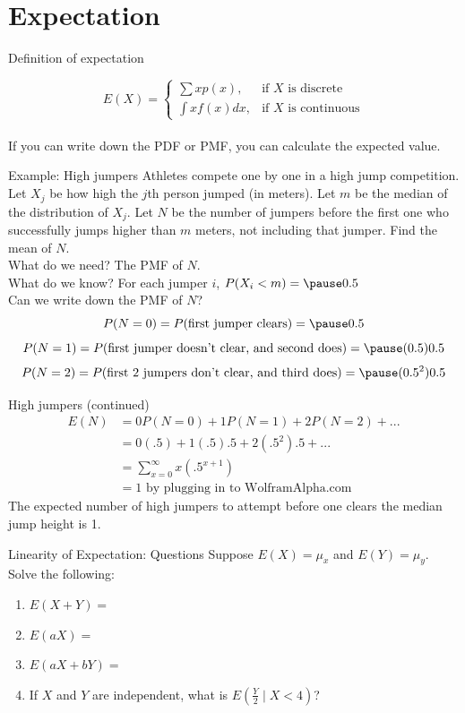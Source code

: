 \documentclass{beamer}
\begin{document}
\section{Expectation}
\begin{frame}{Definition of expectation}

$$E(X)=\begin{cases} \sum xp(x),& \text{if }X\text{ is discrete} \\
\int xf(x)dx,&\text{if }X\text{ is continuous}\end{cases}$$
\\
\alert{If you can write down the PDF or PMF, you can calculate the expected value.}
\end{frame}

\begin{frame}{Example: High jumpers}
Athletes compete one by one in a high jump competition. Let $X_j$ be how high the $j$th person jumped (in meters). Let $m$ be the median of the distribution of $X_j$. Let $N$ be the number of jumpers before the first one who successfully jumps higher than $m$ meters, not including that jumper. Find the mean of $N$.\\
\alert{What do we need?} \pause The PMF of $N$. \pause \\
\alert{What do we know?} \pause For each jumper $i$, $P(X_i<m)=\pause 0.5$ \\ \pause
\alert{Can we write down the PMF of $N$?} \\
\pause
$$P(N=0) = P(\text{first jumper clears}) = \pause 0.5$$
$$P(N=1) = P(\text{first jumper doesn't clear, and second does}) = \pause (0.5)0.5$$
$$P(N=2) = P(\text{first 2 jumpers don't clear, and third does}) = \pause (0.5^2)0.5$$
\end{frame}

\begin{frame}{High jumpers (continued)}
\begin{align*}
E(N) &= 0P(N=0) + 1P(N=1) + 2P(N=2) +... \\
&= 0(.5) + 1(.5).5 + 2(.5^2).5 +... \\
&= \sum_{x=0}^\infty x\left (.5^{x+1}\right ) \\
&= 1 \text{ by plugging in to WolframAlpha.com}
\end{align*}
The expected number of high jumpers to attempt before one clears the median jump height is 1.
\end{frame}

\begin{frame}{Linearity of Expectation: Questions}
Suppose $E(X)=\mu_x$ and $E(Y)=\mu_y$. Solve the following:
\begin{enumerate}
\item $E(X+Y) = $
\item $E(aX) = $
\item $E(aX+bY) = $
\item If $X$ and $Y$ are independent, what is $E\left(\frac{Y}{2}\mid X<4\right)$?
\end{enumerate}
\end{frame}
\end{document}
